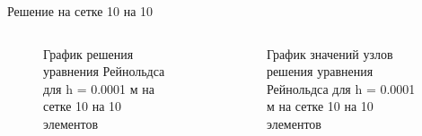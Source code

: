 \documentclass[ignoreonframetext,unicode]{beamer}
\begin{document}
\begin{frame}{Решение на сетке 10 на 10}
	
	\begin{columns}
		
		\begin{figure}[!htbp]
			\caption{График решения уравнения Рейнольдса для h = 0.0001 м на сетке 10 на 10 элементов}
			\label{10x10mesh}
		\end{figure}
		
		\begin{figure}[!htbp]
			\caption{График значений узлов решения уравнения Рейнольдса для h = 0.0001 м на сетке 10 на 10 элементов}
			\label{10x10points}
		\end{figure}
		
	\end{columns}
	
\end{frame}
\end{document}
